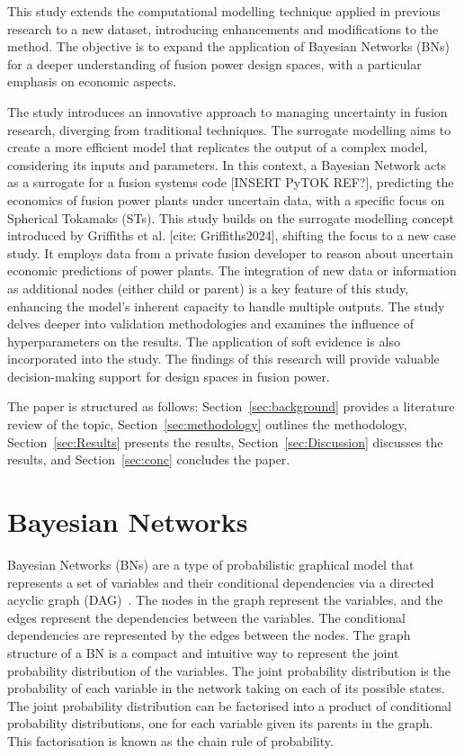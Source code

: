 \documentclass[journal]{IEEEtran}
\begin{document}
This study extends the computational modelling technique applied in previous research to a new dataset, introducing enhancements and modifications to the method. The objective is to expand the application of Bayesian Networks (BNs) for a deeper understanding of fusion power design spaces, with a particular emphasis on economic aspects.


The study introduces an innovative approach to managing uncertainty in fusion research, diverging from traditional techniques. The surrogate modelling aims to create a more efficient model that replicates the output of a complex model, considering its inputs and parameters. In this context, a Bayesian Network acts as a surrogate for a fusion systems code [INSERT PyTOK REF?], predicting the economics of fusion power plants under uncertain data, with a specific focus on Spherical Tokamaks (STs).
This study builds on the surrogate modelling concept introduced by Griffiths et al. [cite: Griffiths2024], shifting the focus to a new case study. It employs data from a private fusion developer to reason about uncertain economic predictions of power plants. The integration of new data or information as additional nodes (either child or parent) is a key feature of this study, enhancing the model's inherent capacity to handle multiple outputs. The study delves deeper into validation methodologies and examines the influence of hyperparameters on the results. The application of soft evidence is also incorporated into the study. The findings of this research will provide valuable decision-making support for design spaces in fusion power.

The paper is structured as follows: Section~\ref{sec:background} provides a literature review of the topic, Section~\ref{sec:methodology} outlines the methodology, Section~\ref{sec:Results} presents the results, Section~\ref{sec:Discussion} discusses the results, and Section~\ref{sec:conc} concludes the paper. 

\section{Bayesian Networks}\label{sec:BNs}

Bayesian Networks (BNs) are a type of probabilistic graphical model that represents a set of variables and their conditional dependencies via a directed acyclic graph (DAG)~\cite{Hand2001IdiotsAll}. The nodes in the graph represent the variables, and the edges represent the dependencies between the variables. The conditional dependencies are represented by the edges between the nodes. The graph structure of a BN is a compact and intuitive way to represent the joint probability distribution of the variables. The joint probability distribution is the probability of each variable in the network taking on each of its possible states. The joint probability distribution can be factorised into a product of conditional probability distributions, one for each variable given its parents in the graph. This factorisation is known as the chain rule of probability.
\end{document}

